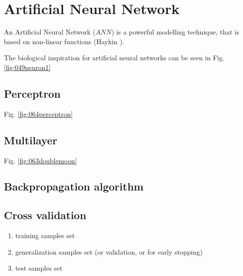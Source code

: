 
\chapter{Artificial Neural Network}
\label{cap:ann}

An Artificial Neural Network ($ANN$) is a powerful modelling technique, 
that is based on non-linear functions (Haykin \cite{RefWorks:158}). 


The biological inspiration for artificial neural networks can be seen in Fig.
\ref{fig:049neuron1}



\section{Perceptron}
\label{sec:perceptron}

Fig. \ref{fig:064perceptron}\\


\section{Multilayer}
\label{sec:multilayer}

Fig. \ref{fig:063doublemoon}\\


\section{Backpropagation algorithm}
\label{sec:backpropagationalgorithm}

\section{Cross validation}
\label{sec:crossvalidation}

\begin{enumerate}
  \item{training samples set}
  \item{generalization samples set (or validation, or for early stopping)}
  \item{test samples set}
\end{enumerate}


